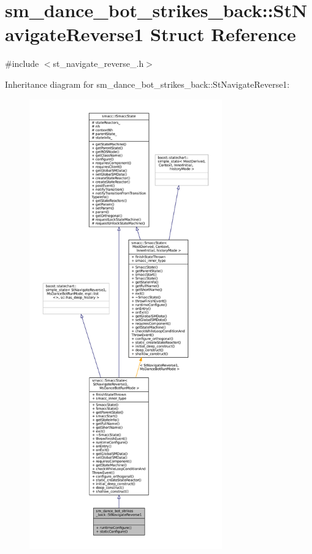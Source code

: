 \hypertarget{structsm__dance__bot__strikes__back_1_1StNavigateReverse1}{}\section{sm\+\_\+dance\+\_\+bot\+\_\+strikes\+\_\+back\+:\+:St\+Navigate\+Reverse1 Struct Reference}
\label{structsm__dance__bot__strikes__back_1_1StNavigateReverse1}


{\ttfamily \#include $<$st\+\_\+navigate\+\_\+reverse\+\_.\+h$>$}



Inheritance diagram for sm\+\_\+dance\+\_\+bot\+\_\+strikes\+\_\+back\+:\+:St\+Navigate\+Reverse1\+:
\nopagebreak
\begin{figure}[H]
\begin{center}
\leavevmode
\includegraphics[height=550pt]{structsm__dance__bot__strikes__back_1_1StNavigateReverse1__inherit__graph}
\end{center}
\end{figure}


